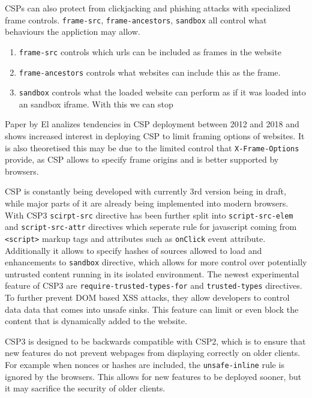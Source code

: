\documentclass[11]{article}   %
\begin{document}
CSPs can also protect from clickjacking and phishing attacks with specialized frame controls. 
\texttt{frame-src}, \texttt{frame-ancestors}, \texttt{sandbox} all control what behaviours the appliction may allow.
\begin{enumerate}
	\item \texttt{frame-src} controls which urls can be included as frames in the website
	\item \texttt{frame-ancestors} controls what websites can include this as the frame. 
	\item \texttt{sandbox} controls what the loaded website can perform as if it was loaded into an sandbox iframe. With this we can stop 
\end{enumerate}
Paper by El analizes tendencies in CSP deployment between 2012 and 2018 and shows increased interest in deploying CSP to limit framing options of websites. \cite{osti_10173479}
It is also theoretised this may be due to the limited control that \texttt{X-Frame-Options} provide, as CSP allows to specify frame origins and is better supported by browsers.


CSP is constantly being developed with currently 3rd version being in draft, while major parts of it are already being implemented into modern browsers.
With CSP3 \texttt{scirpt-src} directive has been further split into \texttt{script-src-elem} and \texttt{script-src-attr} directives which seperate rule for javascript coming from \texttt{<script>} markup tags and attributes such as \texttt{onClick} event attribute.
Additionally it allows to specify hashes of sources allowed to load and enhancements to \texttt{sandbox} directive, which allows for more control over potentially untrusted content running in its isolated environment.
The newest experimental feature of CSP3 are \texttt{require-trusted-types-for} and \texttt{trusted-types} directives.
To further prevent DOM based XSS attacks, they allow developers to control data data that comes into unsafe sinks.
This feature can limit or even block the content that is dynamically added to the website.

CSP3 is designed to be backwards compatible with CSP2, which is to ensure that new features do not prevent webpages from displaying correctly on older clients.
For example when nonces or hashes are included, the \texttt{unsafe-inline} rule is ignored by the browsers.
This allows for new features to be deployed sooner, but it may sacrifice the security of older clients.
\end{document}
